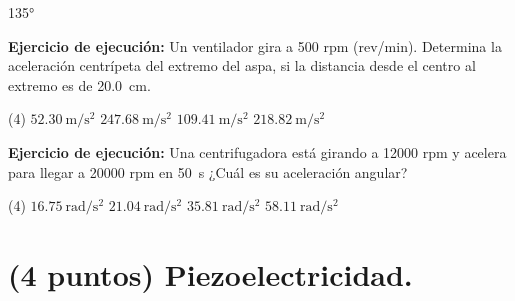 \documentclass[12pt, letter]{exam}
\begin{document}
\begin{questions}
\begin{tasks}
        \task \ang{135}
    \end{tasks}
    \question \label{Ejercicio_02} \textbf{Ejercicio de ejecución: } Un ventilador gira a 500 rpm (rev/min). Determina la aceleración centrípeta del extremo del aspa, si la distancia desde el centro al extremo es de \SI{20.0}{\centi\meter}.
    \begin{tasks}(4)
        \task $\displaystyle \SI[per-mode=fraction]{52.30}{\meter\per\square\second}$
        \task $\displaystyle \SI[per-mode=fraction]{247.68}{\meter\per\square\second}$
        \task $\displaystyle \SI[per-mode=fraction]{109.41}{\meter\per\square\second}$
        \task $\displaystyle \SI[per-mode=fraction]{218.82}{\meter\per\square\second}$
    \end{tasks}
    \question \label{Ejercicio_03} \textbf{Ejercicio de ejecución: } Una centrifugadora está girando a 12000 rpm y acelera para llegar a 20000 rpm en \SI{50}{\second} ¿Cuál es su aceleración angular?
    \begin{tasks}(4)
        \task $\displaystyle \SI[per-mode=fraction]{16.75}{\radian\per\square\second}$
        \task $\displaystyle \SI[per-mode=fraction]{21.04}{\radian\per\square\second}$
        \task $\displaystyle \SI[per-mode=fraction]{35.81}{\radian\per\square\second}$
        \task $\displaystyle \SI[per-mode=fraction]{58.11}{\radian\per\square\second}$
    \end{tasks}

    \section{(4 puntos) Piezoelectricidad.}


\end{questions}
\end{document}
